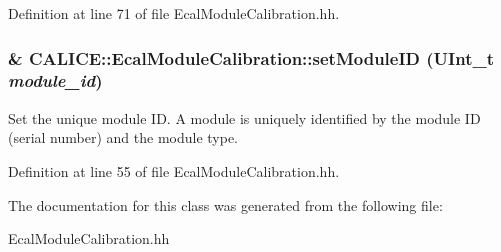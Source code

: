 Definition at line 71 of file EcalModuleCalibration.hh.
\subsubsection[{setModuleID}]{\& CALICE::EcalModuleCalibration::setModuleID (UInt\_\-t {\em module\_\-id})\hspace{0.3cm}{\ttfamily  [inline]}}\label{classCALICE_1_1EcalModuleCalibration_adbc106b41241d89518956fc30e9dba93}


Set the unique module ID. A module is uniquely identified by the module ID (serial number) and the module type. 

Definition at line 55 of file EcalModuleCalibration.hh.

The documentation for this class was generated from the following file:\begin{DoxyCompactItemize}
\item 
EcalModuleCalibration.hh\end{DoxyCompactItemize}
